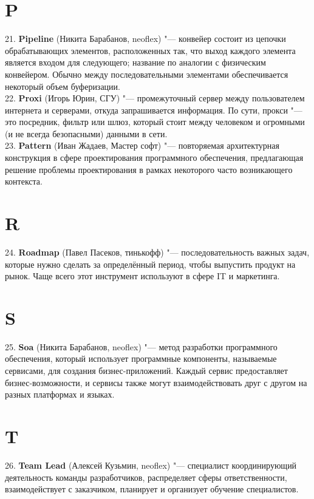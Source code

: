\documentclass[14 pt]{extarticle}
\begin{document}
\section*{P}
    21. \textbf{Pipeline} (Никита Барабанов, neoflex) "--- конвейер состоит из цепочки обрабатывающих элементов, расположенных так, что выход каждого элемента является входом для следующего; название по аналогии с физическим конвейером. Обычно между последовательными элементами обеспечивается некоторый объем буферизации. \\
    
    22. \textbf{Proxi} (Игорь Юрин, СГУ) "--- промежуточный сервер между пользователем интернета и серверами, откуда запрашивается информация. По сути, прокси "--- это посредник, фильтр или шлюз, который стоит между человеком и огромными (и не всегда безопасными) данными в сети. \\
    
    23. \textbf{Pattern} (Иван Жадаев, Мастер софт) "--- повторяемая архитектурная конструкция в сфере проектирования программного обеспечения, предлагающая решение проблемы проектирования в рамках некоторого часто возникающего контекста. \\
    
\section*{R}
    24. \textbf{Roadmap} (Павел Пасеков, тинькофф) "--- последовательность важных задач, которые нужно сделать за определённый период, чтобы выпустить продукт на рынок. Чаще всего этот инструмент используют в сфере IT и маркетинга. \\
    
\section*{S}
    25. \textbf{Soa} (Никита Барабанов, neoflex) "--- метод разработки программного обеспечения, который использует программные компоненты, называемые сервисами, для создания бизнес-приложений. Каждый сервис предоставляет бизнес-возможности, и сервисы также могут взаимодействовать друг с другом на разных платформах и языках. \\
    
\section*{T}
    26. \textbf{Team Lead} (Алексей Кузьмин, neoflex) "--- специалист координирующий деятельность команды разработчиков, распределяет сферы ответственности, взаимодействует с заказчиком, планирует и организует обучение специалистов. \\
    
\end{document}
